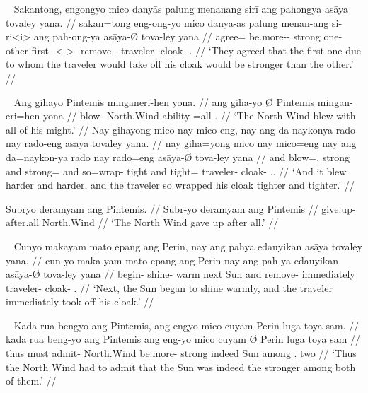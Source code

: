 \ex~ %
\begingl
	\gla Sakantong, engongyo mico danyās palung menanang sirī ang pahongya
		asāya tovaley yana. //
	\glb sakan=tong eng-ong-yo mico danya-as palung menan-ang si-ri<i> ang 
		pah-ong-ya asāya-Ø tova-ley yana //
	\glc agree=\TplN{} be.more-\Irr{}-\TsgN{} strong one-\Parg{} other
		first-\Aarg{} \Rel{}<-\Aarg{}>-\Caus{} \AgtT{}
		remove-\Irr{}-\TsgM{} traveler-\Top{} cloak-\PargI{}
		\TsgM{}.\Gen{} //
	\glft `They agreed that the first one due to whom the traveler would take
		off his cloak would be stronger than the other.' //
\endgl
\xe

\pex~ %
\a \begingl
	\gla Ang gihayo {} Pintemis minganeri-hen yona. //
	\glb ang giha-yo Ø Pintemis mingan-eri=hen yona //
	\glc \AgtT{} blow-\TsgN{} \Top{} North.Wind ability-\Ins{}=all
		\TsgN{}.\Gen{} //
	\glft `The North Wind blew with all of his might.' //
\endgl
\a \begingl
	\gla Nay gihayong mico nay mico-eng, nay ang da-naykonya rado nay rado-eng
		asāya tovaley yana. //
	\glb nay giha=yong mico nay mico=eng nay ang da=naykon-ya rado nay rado=eng
		asāya-Ø tova-ley yana //
	\glc and blow=\TsgN{}.\Aarg{} strong and strong=\Comp{} and \AgtT{}
		so=wrap-\TsgM{} tight and tight=\Comp{} traveler-\Top{}
		cloak-\PargI{} \TsgM{}.\Gen{}. //
	\glft `And it blew harder and harder, and the traveler so wrapped his cloak
		tighter and tighter.' //
\endgl

\a \begingl
	\gla Subryo deramyam ang Pintemis. //
	\glb Subr-yo deramyam ang Pintemis //
	\glc give.up-\TsgN{} {after.all} \Aarg{} North.Wind //
	\glft `The North Wind gave up after all.' //
\endgl
\xe

\ex~ %
\begingl
	\gla Cunyo makayam mato epang ang Perin, nay ang pahya edauyikan asāya
		tovaley yana. //
	\glb cun-yo maka-yam mato epang ang Perin nay ang pah-ya edauyikan asāya-Ø
		tova-ley yana //
	\glc begin-\TsgN{} shine-\Ptcp{} warm next \Aarg{} Sun and \AgtT{}
		remove-\TsgM{} immediately traveler-\Top{} cloak-\PargI{} 
		\TsgM{}.\Gen{} //
	\glft `Next, the Sun began to shine warmly, and the traveler immediately
		took off his cloak.' //
\endgl
\xe

\ex~ %
\begingl
	\gla Kada rua bengyo ang Pintemis, ang engyo mico cuyam {} Perin luga toya
		sam. //
	\glb kada rua beng-yo ang Pintemis ang eng-yo mico cuyam Ø Perin luga toya
		sam //
	\glc thus must admit-\Tsg{} \Aarg{} North.Wind \AgtT{} be.more-\TsgN{}
		strong indeed \Top{} Sun among \TplN{}.\Loc{} two //
	\glft `Thus the North Wind had to admit that the Sun was indeed the
		stronger among both of them.' //
\endgl
\xe

